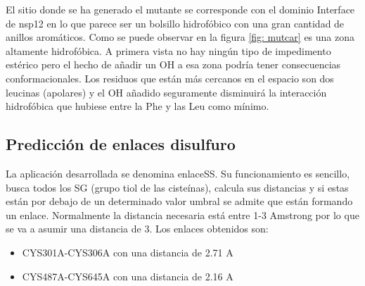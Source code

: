 \documentclass[a4paper,11pt]{report}
\begin{document}
El sitio donde se ha generado el mutante se corresponde con el dominio Interface de nsp12 en lo que parece ser un bolsillo hidrofóbico con una gran cantidad de anillos aromáticos. 
Como se puede observar en la figura \ref{fig: mutcar} es una zona altamente hidrofóbica. A primera vista no hay ningún tipo de impedimento estérico pero el hecho de añadir un OH a esa zona podría tener consecuencias conformacionales. Los residuos que están más cercanos en el espacio son dos leucinas (apolares) y el OH añadido seguramente disminuirá la interacción hidrofóbica que hubiese entre la Phe y las Leu como mínimo.

 \subsection{Predicción de enlaces disulfuro}
 La aplicación desarrollada se denomina enlaceSS. Su funcionamiento es sencillo, busca todos los SG (grupo tiol de las cisteínas), calcula sus distancias y si estas están por debajo de un determinado valor umbral se admite que están formando un enlace. Normalmente la distancia necesaria está entre 1-3 Amstrong por lo que se va a asumir una distancia de 3.
 Los enlaces obtenidos son:
 \begin{itemize}
 	\item CYS301A-CYS306A con una distancia de 2.71 A
 	\item CYS487A-CYS645A con una distancia de 2.16 A
 \end{itemize}
\end{document}
